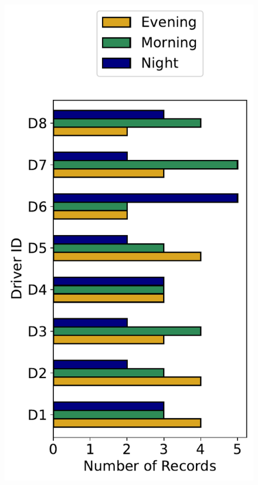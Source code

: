 \begin{figure}[h]
    \centering
    \begin{minipage}{0.33\textwidth}
        \centering
        \includegraphics[width=\textwidth]{images/dreyeve/time_distrib.pdf}
    \end{minipage}\hfill
    \begin{minipage}{0.33\textwidth}

\end{minipage}
\end{figure}
